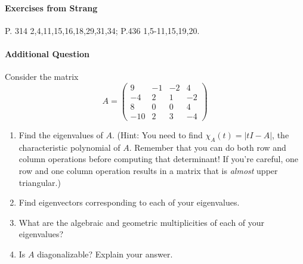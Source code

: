 \documentclass[11pt,twoside]{article}
\begin{document}
 
\paragraph*{Exercises from Strang} P. 314 2,4,11,15,16,18,29,31,34; P.436 1,5-11,15,19,20.

\paragraph*{Additional Question} Consider the matrix $$A=\left(\begin{array}{rrrr}
9 & -1 & -2 & 4 \\
-4 & 2 & 1 & -2 \\
8 & 0 & 0 & 4 \\
-10 & 2 & 3 & -4
\end{array}\right)$$

\begin{enumerate}
  \item Find the eigenvalues of $A$. (Hint: You need to find $\chi_A(t)=|tI-A|$, the characteristic polynomial of $A$. Remember that you can do both row and column operations before computing that determinant! If you're careful, one row and one column operation results in a matrix that is \emph{almost} upper triangular.)
  \item Find eigenvectors corresponding to each of your eigenvalues.
  \item What are the algebraic and geometric multiplicities of each of your eigenvalues?
  \item Is $A$ diagonalizable? Explain your answer.
\end{enumerate}
\end{document}
